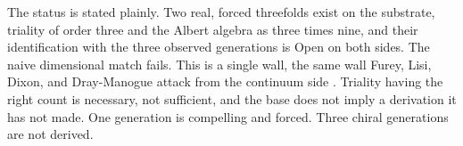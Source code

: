 The status is stated plainly. Two real, forced threefolds exist on the substrate,
triality of order three and the Albert algebra as three times nine, and their
identification with the three observed generations is Open on both sides. The
naive dimensional match fails. This is a single wall, the same wall Furey,
Lisi, Dixon, and Dray-Manogue attack from the continuum side
\cite{furey2018, baez2002octonions}. Triality having the right count is necessary,
not sufficient, and the base does not imply a derivation it has not made. One
generation is compelling and forced. Three chiral generations are not
derived.
